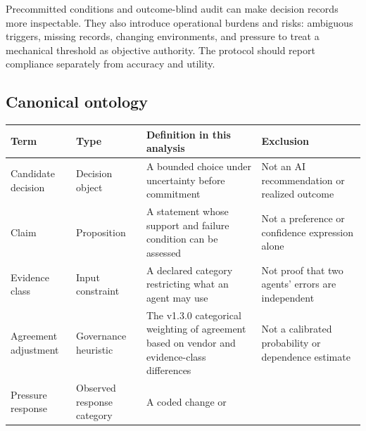 \documentclass[
  english,
]{article}
\newcounter{none} %
\begin{document}
Precommitted conditions and outcome-blind audit can make decision
records more inspectable. They also introduce operational burdens and
risks: ambiguous triggers, missing records, changing environments, and
pressure to treat a mechanical threshold as objective authority. The
protocol should report compliance separately from accuracy and utility.

\subsection{Canonical ontology}\label{canonical-ontology}

{\def\LTcaptype{none} %
\begin{longtable}[]{@{}
  >{\raggedright\arraybackslash}p{}
  >{\raggedright\arraybackslash}p{}
  >{\raggedright\arraybackslash}p{}
  >{\raggedright\arraybackslash}p{}@{}}
\toprule\noalign{}
\begin{minipage}[b]{\linewidth}\raggedright
Term
\end{minipage} & \begin{minipage}[b]{\linewidth}\raggedright
Type
\end{minipage} & \begin{minipage}[b]{\linewidth}\raggedright
Definition in this analysis
\end{minipage} & \begin{minipage}[b]{\linewidth}\raggedright
Exclusion
\end{minipage} \\
\midrule\noalign{}
\endhead
\bottomrule\noalign{}
\endlastfoot
Candidate decision & Decision object & A bounded choice under
uncertainty before commitment & Not an AI recommendation or realized
outcome \\
Claim & Proposition & A statement whose support and failure condition
can be assessed & Not a preference or confidence expression alone \\
Evidence class & Input constraint & A declared category restricting what
an agent may use & Not proof that two agents' errors are independent \\
Agreement adjustment & Governance heuristic & The v1.3.0 categorical
weighting of agreement based on vendor and evidence-class differences &
Not a calibrated probability or dependence estimate \\
Pressure response & Observed response category & A coded change or

\end{longtable}}
\end{document}
